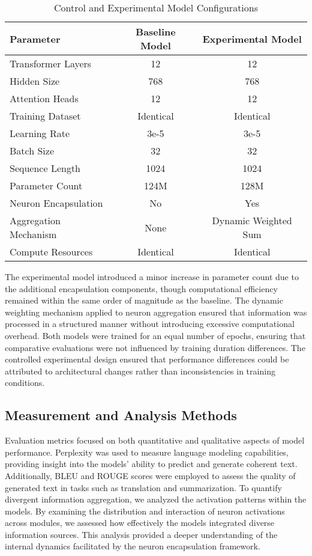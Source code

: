 \documentclass{article}
\begin{document}
\begin{table}[h]
	\centering
	\caption{Control and Experimental Model Configurations}
	\label{tab:exp_config}
		\begin{tabular}{|l|c|c|}
			\hline
			\textbf{Parameter} & \textbf{Baseline Model} & \textbf{Experimental Model} \\
			\hline
			Transformer Layers & 12 & 12 \\
			Hidden Size & 768 & 768 \\
			Attention Heads & 12 & 12 \\
			Training Dataset & Identical & Identical \\
			Learning Rate & 3e-5 & 3e-5 \\
			Batch Size & 32 & 32 \\
			Sequence Length & 1024 & 1024 \\
			Parameter Count & 124M & 128M \\
			Neuron Encapsulation & No & Yes \\
			Aggregation Mechanism & None & Dynamic Weighted Sum \\
			Compute Resources & Identical & Identical \\
			\hline
		\end{tabular}
\end{table}

The experimental model introduced a minor increase in parameter count due to the additional encapsulation components, though computational efficiency remained within the same order of magnitude as the baseline. The dynamic weighting mechanism applied to neuron aggregation ensured that information was processed in a structured manner without introducing excessive computational overhead. Both models were trained for an equal number of epochs, ensuring that comparative evaluations were not influenced by training duration differences. The controlled experimental design ensured that performance differences could be attributed to architectural changes rather than inconsistencies in training conditions.


\subsection{Measurement and Analysis Methods}

Evaluation metrics focused on both quantitative and qualitative aspects of model performance. Perplexity was used to measure language modeling capabilities, providing insight into the models' ability to predict and generate coherent text. Additionally, BLEU and ROUGE scores were employed to assess the quality of generated text in tasks such as translation and summarization. To quantify divergent information aggregation, we analyzed the activation patterns within the models. By examining the distribution and interaction of neuron activations across modules, we assessed how effectively the models integrated diverse information sources. This analysis provided a deeper understanding of the internal dynamics facilitated by the neuron encapsulation framework.
\end{document}
